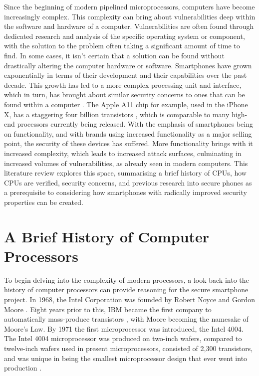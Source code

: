 Since the beginning of modern pipelined microprocessors, computers have become increasingly complex.
This complexity can bring about vulnerabilities deep within the software and hardware of a computer.
Vulnerabilities are often found through dedicated research and analysis of the specific operating system or component, with the solution to the problem often taking a significant amount of time to find.
In some cases, it isn’t certain that a solution can be found without drastically altering the computer hardware or software. 
Smartphones have grown exponentially in terms of their development and their capabilities over the past decade.
This growth has led to a more complex processing unit and interface, which in turn, has brought about similar security concerns to ones that can be found within a computer \cite{RN27}.
The Apple A11 chip for example, used in the iPhone X, has a staggering four billion transistors \cite{RN28}, which is comparable to many high-end processors currently being released.
With the emphasis of smartphones being on functionality, and with brands using increased functionality as a major selling point, the security of these devices has suffered.
More functionality brings with it increased complexity, which leads to increased attack surfaces, culminating in increased volumes of vulnerabilities, as already seen in modern computers.
This literature review explores this space, summarising a brief history of CPUs, how CPUs are verified, security concerns, and previous research into secure phones as a prerequisite to considering how smartphones with radically improved security properties can be created.


\section{A Brief History of Computer Processors}
\label{chap2sec2}

To begin delving into the complexity of modern processors, a look back into the history of computer processors can provide reasoning for the secure smartphone project. 
In 1968, the Intel Corporation was founded by Robert Noyce and Gordon Moore \cite{RN2}.
Eight years prior to this, IBM became the first company to automatically mass-produce transistors \cite{RN2}, with Moore becoming the namesake of Moore’s Law.
By 1971 the first microprocessor was introduced, the Intel 4004.
The Intel 4004 microprocessor was produced on two-inch wafers, compared to twelve-inch wafers used in present microprocessors, consisted of 2,300 transistors, and was unique in being the smallest microprocessor design that ever went into production \cite{RN5}.


